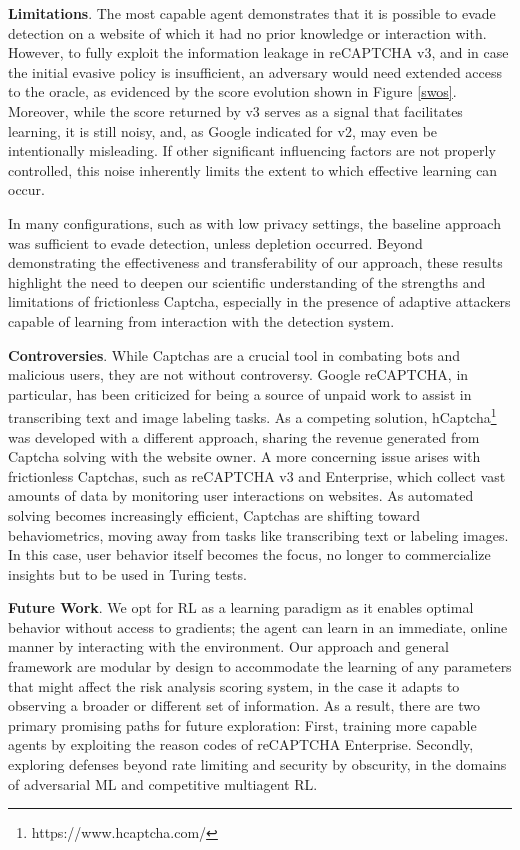 \textbf{Limitations}. The most capable agent demonstrates that it is possible to evade detection on a website of which it had no prior knowledge or interaction with.
However, to fully exploit the information leakage in reCAPTCHA v3, and in case the initial evasive policy is insufficient, an adversary would need extended access to the oracle, as evidenced by the score evolution shown in Figure \ref{swos}.
Moreover, while the score returned by v3 serves as a signal that facilitates learning, it is still noisy, and, as Google indicated for v2, may even be intentionally misleading.
If other significant influencing factors are not properly controlled, this noise inherently limits the extent to which effective learning can occur.

In many configurations, such as with low privacy settings, the baseline approach was sufficient to evade detection, unless depletion occurred.
Beyond demonstrating the effectiveness and transferability of our approach, these results highlight the need to deepen our scientific understanding of the strengths and limitations of frictionless Captcha, especially in the presence of adaptive attackers capable of learning from interaction with the detection system.

\textbf{Controversies}. While Captchas are a crucial tool in combating bots and malicious users, they are not without controversy.
Google reCAPTCHA, in particular, has been criticized for being a source of unpaid work to assist in transcribing text and image labeling tasks.
As a competing solution, hCaptcha\footnote{https://www.hcaptcha.com/} was developed with a different approach, sharing the revenue generated from Captcha solving with the website owner.
A more concerning issue arises with frictionless Captchas, such as reCAPTCHA v3 and Enterprise, which collect vast amounts of data by monitoring user interactions on websites.
As automated solving becomes increasingly efficient, Captchas are shifting toward behaviometrics, moving away from tasks like transcribing text or labeling images.
In this case, user behavior itself becomes the focus, no longer to commercialize insights but to be used in Turing tests.

\textbf{Future Work}.
We opt for \gls{RL} as a learning paradigm as it enables optimal behavior without access to gradients; the agent can learn in an immediate, online manner by interacting with the environment.
Our approach and general framework are modular by design to accommodate the learning of any parameters that might affect the risk analysis scoring system, in the case it adapts to observing a broader or different set of information.
As a result, there are two primary promising paths for future exploration:
First, training more capable agents by exploiting the reason codes of reCAPTCHA Enterprise.
Secondly, exploring defenses beyond rate limiting and security by obscurity, in the domains of adversarial \gls{ML} and competitive multiagent \gls{RL}.

